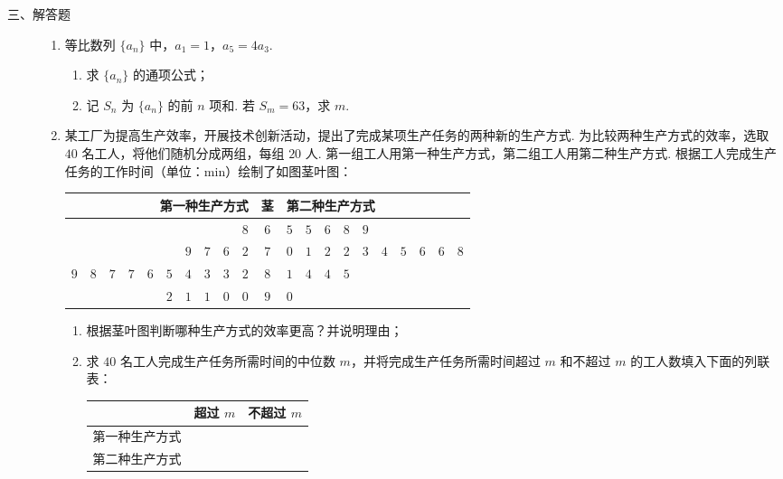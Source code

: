 \begin{description}

    \item[三、解答题]

    \begin{enumerate}[leftmargin=5pt]

      \addtocounter{enumi}{+16}

        \item 等比数列 \(\{a_n\}\) 中，\(a_1=1\)，\(a_5=4a_3\).

\begin{enumerate}
\item 求 \(\{a_n\}\) 的通项公式；
\item 记 \(S_n\) 为 \(\{a_n\}\) 的前 \(n\) 项和. 若 \(S_m=63\)，求 \(m\).
\end{enumerate}

        \item 某工厂为提高生产效率，开展技术创新活动，提出了完成某项生产任务的两种新的生产方式. 为比较两种生产方式的效率，选取 \(40\) 名工人，将他们随机分成两组，每组 \(20\) 人. 第一组工人用第一种生产方式，第二组工人用第二种生产方式. 根据工人完成生产任务的工作时间（单位：\(\mathrm{min}\)）绘制了如图茎叶图：

\begin{center}
\begin{tabular}{r|c|l}
第一种生产方式 & 茎 & 第二种生产方式 \\
\hline
\(8\) & \(6\) & \(5\quad5\quad6\quad8\quad9\) \\
\(9\quad7\quad6\quad2\) & \(7\) & \(0\quad1\quad2\quad2\quad3\quad4\quad5\quad6\quad6\quad8\) \\
\(9\quad8\quad7\quad7\quad6\quad5\quad4\quad3\quad3\quad2\) & \(8\) & \(1\quad4\quad4\quad5\) \\
\(2\quad1\quad1\quad0\quad0\) & \(9\) & \(0\)
\end{tabular}
\end{center}

\begin{enumerate}
\item 根据茎叶图判断哪种生产方式的效率更高？并说明理由；
\item 求 \(40\) 名工人完成生产任务所需时间的中位数 \(m\)，并将完成生产任务所需时间超过 \(m\) 和不超过 \(m\) 的工人数填入下面的列联表：
\begin{center}
\begin{tabular}{c|c|c}
 & 超过 \(m\) & 不超过 \(m\) \\
\hline
第一种生产方式 &  &  \\
\hline
第二种生产方式 &  &  \\
\end{tabular}
\end{center}


\end{enumerate}
\end{enumerate}
\end{description}
